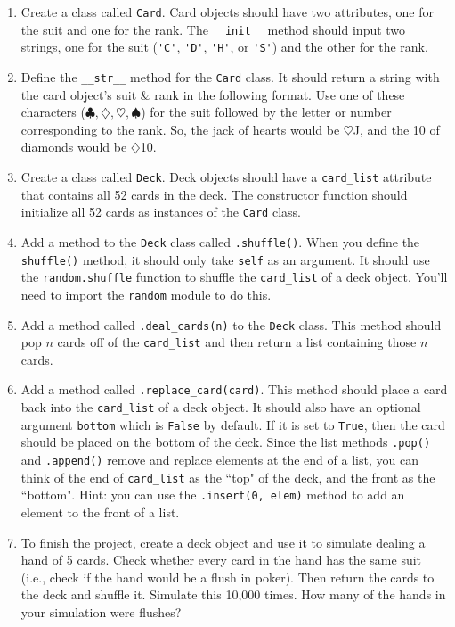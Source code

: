 \documentclass[12pt]{article}
\begin{document}
\begin{enumerate}

\item Create a class called \verb|Card|.  Card objects should have two attributes, one for the suit and one for the rank.  The \verb|__init__| method should input two strings, one for the suit (\verb|'C'|, \verb|'D'|, \verb|'H'|, or \verb|'S'|) and the other for the rank. 

\item Define the \verb|__str__| method for the \verb|Card| class.  It should return a string with the card object's suit \& rank in the following format.  Use one of these characters ($\clubsuit, \diamondsuit, \heartsuit, \spadesuit$) for the suit followed by the letter or number corresponding to the rank.  So, the jack of hearts would be $\heartsuit$J, and the 10 of diamonds would be $\diamondsuit$10. 

\item Create a class called \verb|Deck|. Deck objects should have a \verb|card_list| attribute that contains all 52 cards in the deck.  The constructor function should initialize all 52 cards as instances of the \verb|Card| class. 


\item Add a method to the \verb|Deck| class called \verb|.shuffle()|. When you define the \verb|shuffle()| method, it should only take \verb|self| as an argument. It should use the \verb|random.shuffle| function to shuffle the \verb|card_list| of a deck object.  You'll need to import the \verb|random| module to do this. 

\item Add a method called \verb|.deal_cards(n)| to the \verb|Deck| class.  This method should pop $n$ cards off of the \verb|card_list| and then return a list containing those $n$ cards.  

\item Add a method called \verb|.replace_card(card)|.  This method should place a card back into the \verb|card_list| of a deck object.  It should also have an optional argument \verb|bottom| which is \verb|False| by default.  If it is set to \verb|True|, then the card should be placed on the bottom of the deck. Since the list methods \verb|.pop()| and \verb|.append()| remove and replace elements at the end of a list, you can think of the end of \verb|card_list| as the ``top" of the deck, and the front as the ``bottom".  Hint: you can use the \verb|.insert(0, elem)| method to add an element to the front of a list. 

\item To finish the project, create a deck object and use it to simulate dealing a hand of 5 cards. Check whether every card in the hand has the same suit (i.e., check if the hand would be a flush in poker).  Then return the cards to the deck and shuffle it.  Simulate this 10{,}000 times.  How many of the hands in your simulation were flushes?  



\end{enumerate}
\end{document}
